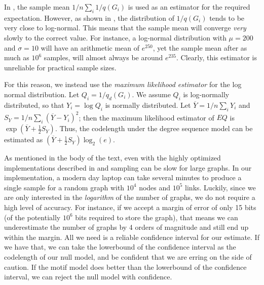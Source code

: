 In \cite{blitzstein2011sequential}, the sample mean $1/n \sum_i 1/q(G_i)$ is used as an estimator for the required expectation. However, as shown in \cite{charo2010efficient}, the distribution of $1/q(G_i)$ tends to be very close to log-normal. This means that the sample mean will converge \emph{very} slowly to the correct value. For instance, a log-normal distribution with $\mu=200$ and $\sigma=10$ will have an arithmetic mean of  $e^{250}$, yet the sample mean after as much as $10^6$ samples, will almost always be around $e^{235}$. Clearly, this estimator is unreliable for practical sample sizes.

For this reason, we instead use the \emph{maximum likelihood estimator} for the log normal distribution. Let $Q_i = 1/q_d(G_i)$. We assume $Q_i$ is log-normally distributed, so that $Y_i = \log Q_i$ is normally distributed. Let $\overline{Y} = 1/n\sum_i Y_i$ and $S_Y = 1/n \sum_i (\overline{Y} - Y_i)^2$; then the maximum likelihood estimator of $EQ$ is $\exp\left(\overline{Y} + \frac{1}{2}S_Y\right)$. Thus, the codelength under the degree sequence model can be estimated as $\left(\overline{Y} + \frac{1}{2}S_Y\right)\log_2(e)$.

As mentioned in the body of the text, even with the highly optimized implementations described in \cite{charo2010efficient} and \cite{kim2012constructing} sampling can be slow for large graphs. In our implementation, a modern day laptop can take several minutes to produce a single sample for a random graph with $10^4$ nodes and $10^5$ links. Luckily, since we are only interested in the \emph{logarithm} of the number of graphs, we do not require a high level of accuracy. For instance, if we accept a margin of error of only 15 bits (of the potentially $10^6$ bits required to store the graph), that means we can underestimate the number of graphs by 4 orders of magnitude and still end up within the margin. All we need is a reliable confidence interval for our estimate. If we have that, we can take the lowerbound of the confidence interval as the codelength of our null model, and be confident that we are erring on the side of caution. If the motif model does better than the lowerbound of the confidence interval, we can reject the null model with confidence.

